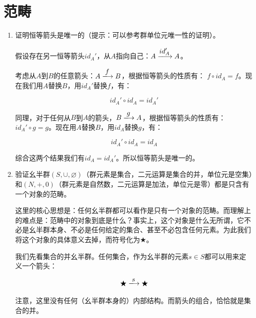 \documentclass[UTF8]{article}
\begin{document}
\section{范畴}

\begin{enumerate}
\item {证明恒等箭头是唯一的（提示：可以参考群单位元唯一性的证明）。}

假设存在另一恒等箭头$id_A'$，从$A$指向自己：$A \arrowto{id_A'} A$。

考虑从$A$到$B$的任意箭头：$A \arrowto{f} B$，根据恒等箭头的性质有：
$f \circ id_A = f$。现在我们用$A$替换$B$，用$id_A'$替换$f$，有：

\[
id_A' \circ id_A = id_A'
\]

同理，对于任何从$B$到$A$的箭头，$B \arrowto{g} A$，根据恒等箭头的性质有：
$id_A' \circ g = g$。现在用$A$替换$B$，用$id_A$替换$g$，有：

\[
id_A' \circ id_A = id_A
\]

综合这两个结果我们有$id_A = id_A'$。所以恒等箭头是唯一的。

\item {验证幺半群$(S, \cup, \varnothing)$（群元素是集合，二元运算是集合的并，单位元是空集）和$(N, +, 0)$（群元素是自然数，二元运算是加法，单位元是零）都是只含有一个对象的范畴。}

这里的核心思想是：任何幺半群都可以看作是只有一个对象的范畴。而理解上的难点是：范畴中的对象到底是什么？事实上，这个对象是什么无所谓，它不必是幺半群本身、不必是任何给定的集合、甚至不必包含任何元素。为此我们将这个对象的具体意义去掉，而符号化为$\bigstar$。

我们先看集合的并幺半群。任何集合，作为幺半群的元素$s \in S$都可以用来定义一个箭头：

\[
\bigstar \arrowto{s} \bigstar
\]

注意，这里没有任何（幺半群本身的）内部结构。而箭头的组合，恰恰就是集合的并。

\begin{center}
\end{center}


\end{enumerate}
\end{document}

